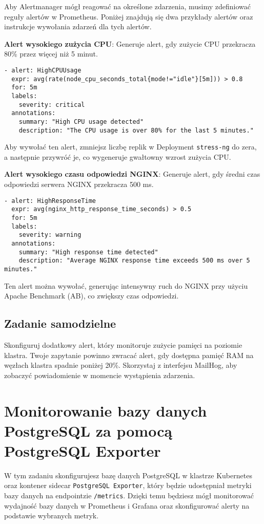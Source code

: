 \documentclass{article}
\begin{document}
Aby Alertmanager mógł reagować na określone zdarzenia, musimy zdefiniować reguły alertów w Prometheus. Poniżej znajdują się dwa przykłady alertów oraz instrukcje wywołania zdarzeń dla tych alertów.

\textbf{Alert wysokiego zużycia CPU}: Generuje alert, gdy zużycie CPU przekracza 80\% przez więcej niż 5 minut.
\begin{lstlisting}
- alert: HighCPUUsage
  expr: avg(rate(node_cpu_seconds_total{mode!="idle"}[5m])) > 0.8
  for: 5m
  labels:
    severity: critical
  annotations:
    summary: "High CPU usage detected"
    description: "The CPU usage is over 80% for the last 5 minutes."
\end{lstlisting}

Aby wywołać ten alert, zmniejsz liczbę replik w Deployment \texttt{stress-ng} do zera, a następnie przywróć je, co wygeneruje gwałtowny wzrost zużycia CPU.

\textbf{Alert wysokiego czasu odpowiedzi NGINX}: Generuje alert, gdy średni czas odpowiedzi serwera NGINX przekracza 500 ms.
\begin{lstlisting}
- alert: HighResponseTime
  expr: avg(nginx_http_response_time_seconds) > 0.5
  for: 5m
  labels:
    severity: warning
  annotations:
    summary: "High response time detected"
    description: "Average NGINX response time exceeds 500 ms over 5 minutes."
\end{lstlisting}

Ten alert można wywołać, generując intensywny ruch do NGINX przy użyciu Apache Benchmark (AB), co zwiększy czas odpowiedzi.


\subsection{Zadanie samodzielne}

Skonfiguruj dodatkowy alert, który monitoruje zużycie pamięci na poziomie klastra. Twoje zapytanie powinno zwracać alert, gdy dostępna pamięć RAM na węzłach klastra spadnie poniżej 20\%. Skorzystaj z interfejsu MailHog, aby zobaczyć powiadomienie w momencie wystąpienia zdarzenia.

\section{Monitorowanie bazy danych PostgreSQL za pomocą PostgreSQL Exporter}

W tym zadaniu skonfigurujesz bazę danych PostgreSQL w klastrze Kubernetes oraz kontener sidecar \texttt{PostgreSQL Exporter}, który będzie udostępniał metryki bazy danych na endpointzie \texttt{/metrics}. Dzięki temu będziesz mógł monitorować wydajność bazy danych w Prometheus i Grafana oraz skonfigurować alerty na podstawie wybranych metryk.
\end{document}

